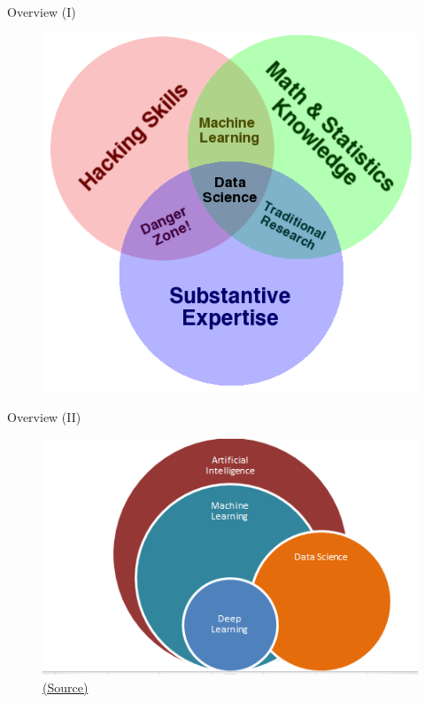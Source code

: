 \documentclass[10pt,compress]{beamer} %
\begin{document}
\begin{frame}{Overview (I)}
	\begin{figure}
		\includegraphics[scale=0.35]{figs/Data_Science_VD.png}	
	\end{figure}				
\end{frame}

\begin{frame}{Overview (II)}
	\begin{figure}
		\includegraphics[scale=0.5]{figs/venn-ml.png}\\
		\centering \tiny \href{https://ai6forums.nurture.ai/t/discuss-artificial-intelligence-machine-learning-deep-learning-data-science/781}{(Source)}
	\end{figure}				
\end{frame}
\end{document}
